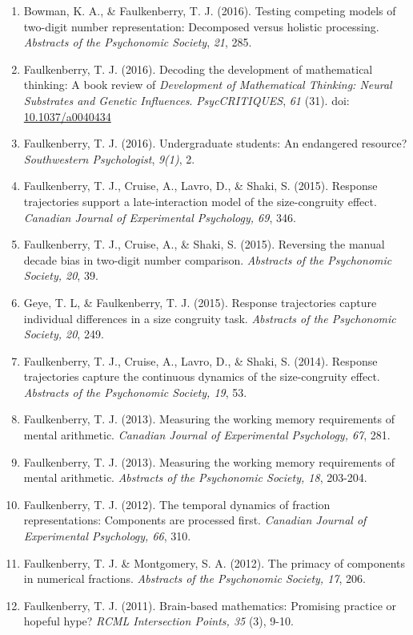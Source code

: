 \documentclass[article,10pt]{article}
\begin{document}
\begin{enumerate}
\item Bowman, K. A., \& Faulkenberry, T. J. (2016). Testing competing models of two-digit number representation: Decomposed versus holistic processing. \emph{Abstracts of the Psychonomic Society}, \emph{21}, 285.
\item Faulkenberry, T. J. (2016). Decoding the development of mathematical thinking: A book review of \emph{Development of Mathematical Thinking: Neural Substrates and Genetic Influences}. \emph{PsycCRITIQUES}, \emph{61} (31). doi: \href{http://dx.doi.org/10.1037/a0040434}{10.1037/a0040434}
\item Faulkenberry, T. J. (2016). Undergraduate students: An endangered resource? \emph{Southwestern Psychologist}, \emph{9(1)}, 2.
\item Faulkenberry, T. J., Cruise, A., Lavro, D., \& Shaki, S. (2015). Response trajectories support a late-interaction model of the size-congruity effect. \emph{Canadian Journal of Experimental Psychology, 69}, 346.
\item Faulkenberry, T. J., Cruise, A., \& Shaki, S. (2015). Reversing the manual decade bias in two-digit number comparison. \emph{Abstracts of the Psychonomic Society, 20}, 39.
\item Geye, T. L, \& Faulkenberry, T. J. (2015). Response trajectories capture individual differences in a size congruity task. \emph{Abstracts of the Psychonomic Society, 20}, 249.
\item Faulkenberry, T. J., Cruise, A., Lavro, D., \& Shaki, S. (2014). Response trajectories capture the continuous dynamics of the size-congruity effect. \emph{Abstracts of the Psychonomic Society, 19}, 53.
\item Faulkenberry, T. J. (2013). Measuring the working memory requirements of mental arithmetic. \emph{Canadian Journal of Experimental Psychology, 67}, 281.
\item Faulkenberry, T. J. (2013). Measuring the working memory requirements of mental arithmetic. \emph{Abstracts of the Psychonomic Society, 18}, 203-204.
\item Faulkenberry, T. J. (2012). The temporal dynamics of fraction representations: Components are processed first. \emph{Canadian Journal of Experimental Psychology, 66}, 310.
\item Faulkenberry, T. J. \& Montgomery, S. A. (2012). The primacy of components in numerical fractions. \emph{Abstracts of the Psychonomic Society, 17}, 206.
\item Faulkenberry, T. J. (2011). Brain-based mathematics: Promising practice or hopeful hype? \emph{RCML Intersection Points, 35} (3), 9-10.

\end{enumerate}
\end{document}
